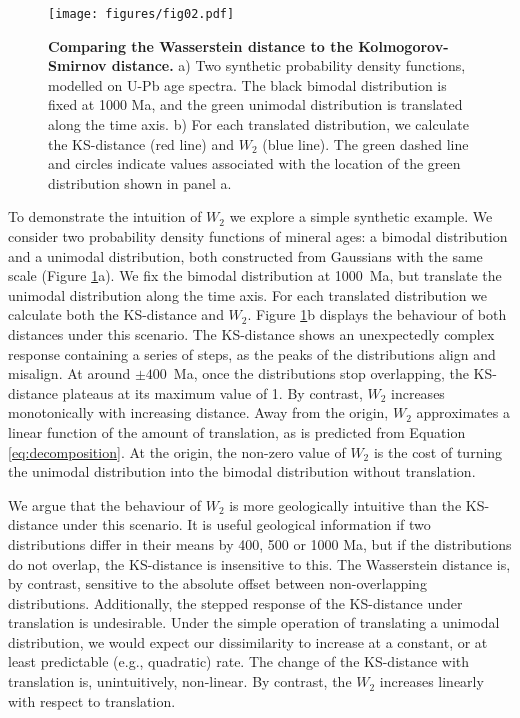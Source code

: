 \documentclass[gchron, manuscript]{article}
\begin{document}
\begin{figure}
    \centering
    \texttt{[image: figures/fig02.pdf]}
    \caption{\textbf{Comparing the Wasserstein distance to the Kolmogorov-Smirnov distance.} a) Two synthetic probability density functions, modelled on U-Pb age spectra. The black bimodal distribution is fixed at 1000 Ma, and the green unimodal distribution is translated along the time axis. b) For each translated distribution, we calculate the KS-distance (red line) and $W_2$ (blue line). The green dashed line and circles indicate values associated with the location of the green distribution shown in panel a.}
    \label{fig:translation}
\end{figure}

To demonstrate the intuition of $W_2$ we explore a simple synthetic example. We consider two probability density functions of mineral ages: a bimodal distribution and a unimodal distribution, both constructed from Gaussians with the same scale (Figure \ref{fig:translation}a). We fix the bimodal distribution at 1000~Ma, but translate the unimodal distribution along the time axis. For each translated distribution we calculate both the KS-distance and $W_2$. Figure \ref{fig:translation}b displays the behaviour of both distances under this scenario. The KS-distance shows an unexpectedly complex response containing a series of steps, as the peaks of the distributions align and misalign. At around $\pm{400}$~Ma, once the distributions stop overlapping, the KS-distance plateaus at its maximum value of 1. By contrast, $W_2$ increases monotonically with increasing distance. Away from the origin, $W_2$ approximates a linear function of the amount of translation, as is predicted from Equation \ref{eq:decomposition}. At the origin, the non-zero value of $W_2$ is the cost of turning the unimodal distribution into the bimodal distribution without translation. 

We argue that the behaviour of $W_2$ is more geologically intuitive than the KS-distance under this scenario. It is useful geological information if two distributions differ in their means by 400, 500 or 1000 Ma, but if the distributions do not overlap, the KS-distance is insensitive to this. The Wasserstein distance is, by contrast, sensitive to the absolute offset between non-overlapping distributions. Additionally, the stepped response of the KS-distance under translation is undesirable. Under the simple operation of translating a unimodal distribution, we would expect our dissimilarity to increase at a constant, or at least predictable (e.g., quadratic) rate. The change of the KS-distance with translation is, unintuitively, non-linear. By contrast, the $W_2$ increases linearly with respect to translation.
\end{document}

